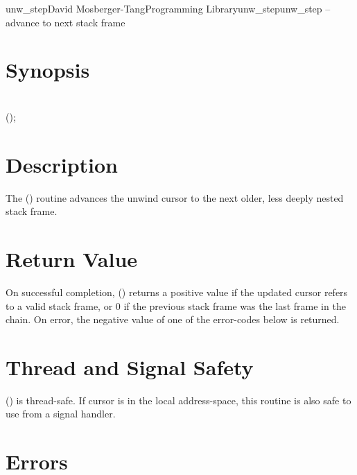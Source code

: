 \documentclass{article}
\begin{document}
\begin{Name}{3}{unw\_step}{David Mosberger-Tang}{Programming Library}{unw\_step}unw\_step -- advance to next stack frame
\end{Name}

\section{Synopsis}

\\

 ();\\

\section{Description}

The () routine advances the unwind cursor  to
the next older, less deeply nested stack frame.

\section{Return Value}

On successful completion, () returns a positive value
if the updated cursor refers to a valid stack frame, or 0 if the
previous stack frame was the last frame in the chain.  On error, the
negative value of one of the error-codes below is returned.

\section{Thread and Signal Safety}

() is thread-safe.  If cursor  is in the local
address-space, this routine is also safe to use from a signal handler.

\section{Errors}
\end{document}
